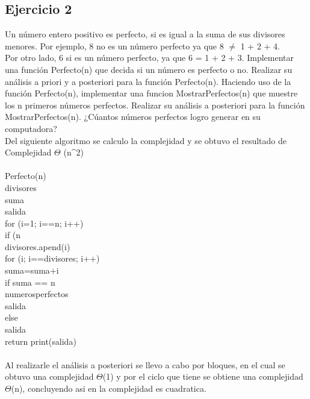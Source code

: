 \documentclass[12pt,twoside]{article}
\begin{document}
\subsection{Ejercicio 2}
Un número entero positivo es perfecto, si es igual a la suma de sus divisores menores. Por  ejemplo,  8  no  es  un  número  perfecto  ya  que  8 $\neq$ 1 + 2 + 4.
\\
Por otro lado,  6  si es un número perfecto, ya que 6 = 1 + 2 + 3. Implementar una función Perfecto(n) que decida si un número es perfecto o no. Realizar su análisis a priori y a posteriori para la función Perfecto(n). Haciendo uso de la función Perfecto(n), implementar una funcion MostrarPerfectos(n) que muestre los n primeros números perfectos. Realizar su análisis a posteriori para la función MostrarPerfectos(n). ¿Cúantos números perfectos logro generar en su computadora?
\\
Del siguiente algoritmo se calculo la complejidad y se obtuvo el resultado de Complejidad $\Theta$ {(n^2)}
\\
\\
Perfecto(n)
\\
divisores 
\\
suma
\\
salida
\\
for (i=1; i==n; i++)
\\
if (n%
\\
divisores.apend(i)
\\
for (i; i==divisores; i++)
\\
suma=suma+i
\\
if suma == n 
\\
numerosperfectos 
\\
salida
\\
else 
\\
salida
\\
return print(salida)
\\
\\

Al realizarle el análisis a posteriori se llevo a cabo por bloques, en el cual se obtuvo una complejidad $\Theta$(1) y por el ciclo que tiene se obtiene una complejidad $\Theta$(n), concluyendo asi en la complejidad es cuadratica. 


\clearpage

\newpage
\end{document}
